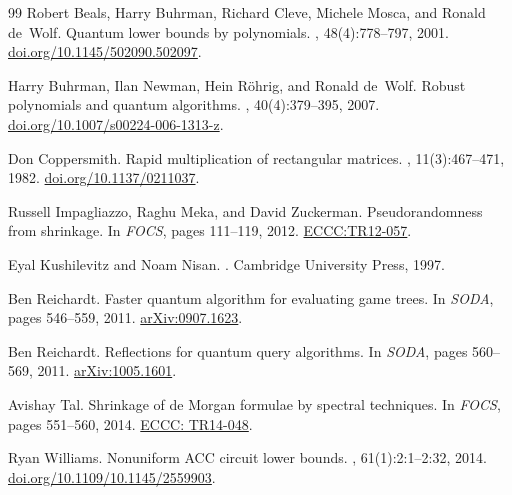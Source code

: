 \documentclass[10pt,a4paper]{article}
\begin{document}
\begin{thebibliography}{99}
Robert Beals, Harry Buhrman, Richard Cleve, Michele Mosca, and Ronald de~Wolf.
\newblock Quantum lower bounds by polynomials.
, 48(4):778--797, 2001.
\newblock
  \href{https://doi.org/10.1145/502090.502097}{doi.org/10.1145/502090.502097}.

Harry Buhrman, Ilan Newman, Hein R{\"{o}}hrig, and Ronald de~Wolf.
\newblock Robust polynomials and quantum algorithms.
, 40(4):379--395, 2007.
\newblock
  \href{https://doi.org/10.1007/s00224-006-1313-z}{doi.org/10.1007/s00224-006-1313-z}.

Don Coppersmith.
\newblock Rapid multiplication of rectangular matrices.
, 11(3):467--471, 1982.
\newblock \href{https://doi.org/10.1137/0211037}{doi.org/10.1137/0211037}.

Russell Impagliazzo, Raghu Meka, and David Zuckerman.
\newblock Pseudorandomness from shrinkage.
\newblock In {\em {FOCS}}, pages 111--119, 2012.
\newblock \href{https://eccc.weizmann.ac.il/report/2012/057/}{ECCC:TR12-057}.

Eyal Kushilevitz and Noam Nisan.
.
\newblock Cambridge University Press, 1997.

Ben Reichardt.
\newblock Faster quantum algorithm for evaluating game trees.
\newblock In {\em {SODA}}, pages 546--559, 2011.
\newblock \href{https://arxiv.org/abs/0907.1623}{arXiv:0907.1623}.

Ben Reichardt.
\newblock Reflections for quantum query algorithms.
\newblock In {\em {SODA}}, pages 560--569, 2011.
\newblock \href{https://arxiv.org/abs/1005.1601}{arXiv:1005.1601}.

Avishay Tal.
\newblock Shrinkage of de {Morgan} formulae by spectral techniques.
\newblock In {\em {FOCS}}, pages 551--560, 2014.
\newblock \href{https://eccc.weizmann.ac.il/report/2014/048/}{ECCC: TR14-048}.

Ryan Williams.
\newblock Nonuniform {ACC} circuit lower bounds.
, 61(1):2:1--2:32, 2014.
\newblock
  \href{https://doi.org/10.1109/10.1145/2559903}{doi.org/10.1109/10.1145/2559903}.

\end{thebibliography}
\end{document}
